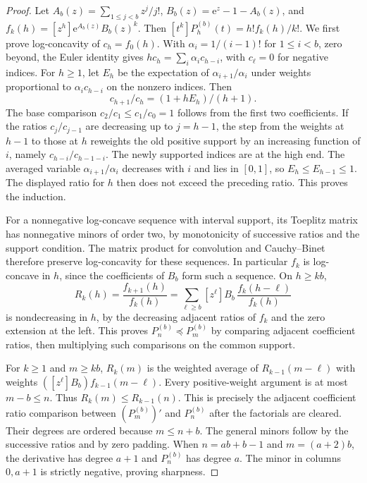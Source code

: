 \documentclass[11pt]{article}
\newcommand{\ee}{\mathrm e}
\begin{document}
\begin{proof}
Let \(A_b(z)=\sum_{1\le j<b}z^j/j!\), \(B_b(z)=\ee^z-1-A_b(z)\), and
\(f_k(h)=[z^h]\ee^{A_b(z)}B_b(z)^k\).
Then \([t^k]P^{(b)}_h(t)=h!f_k(h)/k!\).
We first prove log-concavity of \(c_h=f_0(h)\). With \(\alpha_i=1/(i-1)!\) for \(1\le i<b\), zero beyond, the Euler identity gives \(h c_h=\sum_i \alpha_i c_{h-i}\), with \(c_\ell=0\) for negative indices. For \(h\ge1\), let \(E_h\) be the expectation of \(\alpha_{i+1}/\alpha_i\) under weights proportional to \(\alpha_i c_{h-i}\) on the nonzero indices. Then
\[
 c_{h+1}/c_h=(1+h E_h)/(h+1).
\]
The base comparison \(c_2/c_1\le c_1/c_0=1\) follows from the first two coefficients. If the ratios \(c_j/c_{j-1}\) are decreasing up to \(j=h-1\), the step from the weights at \(h-1\) to those at \(h\) reweights the old positive support by an increasing function of \(i\), namely \(c_{h-i}/c_{h-1-i}\). The newly supported indices are at the high end. The averaged variable \(\alpha_{i+1}/\alpha_i\) decreases with \(i\) and lies in \([0,1]\), so \(E_h\le E_{h-1}\le1\). The displayed ratio for \(h\) then does not exceed the preceding ratio. This proves the induction.

For a nonnegative log-concave sequence with interval support, its Toeplitz matrix has nonnegative minors of order two, by monotonicity of successive ratios and the support condition. The matrix product for convolution and Cauchy--Binet therefore preserve log-concavity for these sequences. In particular \(f_k\) is log-concave in \(h\), since the coefficients of \(B_b\) form such a sequence. On \(h\ge kb\),
\[
 R_k(h)=\frac{f_{k+1}(h)}{f_k(h)}
   =\sum_{\ell\ge b}[z^\ell]B_b\,
                    \frac{f_k(h-\ell)}{f_k(h)}
\]
is nondecreasing in \(h\), by the decreasing adjacent ratios of \(f_k\) and the zero extension at the left. This proves \(P^{(b)}_n\preceq P^{(b)}_m\) by comparing adjacent coefficient ratios, then multiplying such comparisons on the common support.

For \(k\ge1\) and \(m\ge kb\), \(R_k(m)\) is the weighted average of \(R_{k-1}(m-\ell)\) with weights \(([z^\ell]B_b) f_{k-1}(m-\ell)\). Every positive-weight argument is at most \(m-b\le n\). Thus \(R_k(m)\le R_{k-1}(n)\). This is precisely the adjacent coefficient ratio comparison between \((P^{(b)}_m)'\) and \(P^{(b)}_n\) after the factorials are cleared. Their degrees are ordered because \(m\le n+b\). The general minors follow by the successive ratios and by zero padding. When \(n=ab+b-1\) and \(m=(a+2)b\), the derivative has degree \(a+1\) and \(P^{(b)}_n\) has degree \(a\). The minor in columns \(0,a+1\) is strictly negative, proving sharpness.


\end{proof}
\end{document}
